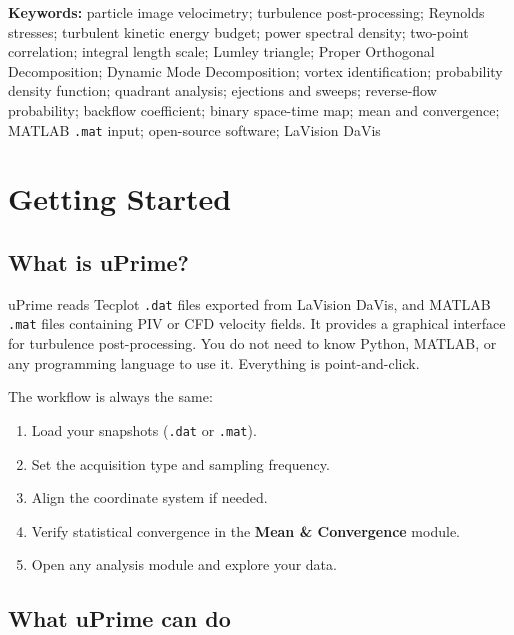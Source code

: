 \documentclass[11pt, a4paper]{report}
\newcommand{\uipth}[1]{\textbf{\textcolor{upblue}{#1}}}
\newcommand{\software}[1]{\textsf{#1}}
\begin{document}
\vspace{0.5cm}
\noindent\textbf{Keywords:} particle image velocimetry; turbulence post-processing; Reynolds stresses; turbulent kinetic energy budget; power spectral density; two-point correlation; integral length scale; Lumley triangle; Proper Orthogonal Decomposition; Dynamic Mode Decomposition; vortex identification; probability density function; quadrant analysis; ejections and sweeps; reverse-flow probability; backflow coefficient; binary space-time map; mean and convergence; MATLAB \texttt{.mat} input; open-source software; LaVision DaVis

\tableofcontents
\clearpage

\chapter{Getting Started}

\section{What is uPrime?}

\software{uPrime} reads Tecplot \texttt{.dat} files exported from LaVision DaVis, and MATLAB \texttt{.mat} files containing PIV or CFD velocity fields. It provides a graphical interface for turbulence post-processing. You do not need to know Python, MATLAB, or any programming language to use it. Everything is point-and-click.

The workflow is always the same:
\begin{enumerate}[leftmargin=1.5em]
  \item Load your snapshots (\texttt{.dat} or \texttt{.mat}).
  \item Set the acquisition type and sampling frequency.
  \item Align the coordinate system if needed.
  \item Verify statistical convergence in the \uipth{Mean \& Convergence} module.
  \item Open any analysis module and explore your data.
\end{enumerate}

\section{What uPrime can do}
\end{document}
